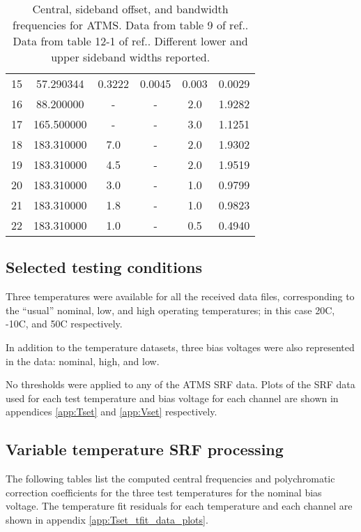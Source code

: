 \begin{table}[htp]
\begin{tabular}{c c c c c c}
           15        &  57.290344  & 0.3222 & 0.0045 & 0.003  & 0.0029        \\
           16        &  88.200000  & -      & -      & 2.0    & 1.9282        \\
           17        & 165.500000  & -      & -      & 3.0    & 1.1251        \\
           18        & 183.310000  & 7.0    & -      & 2.0    & 1.9302        \\
           19        & 183.310000  & 4.5    & -      & 2.0    & 1.9519        \\
           20        & 183.310000  & 3.0    & -      & 1.0    & 0.9799        \\
           21        & 183.310000  & 1.8    & -      & 1.0    & 0.9823        \\
           22        & 183.310000  & 1.0    & -      & 0.5    & 0.4940        \\
    \hline
  \end{tabular}
  \caption{Central, sideband offset, and bandwidth frequencies for ATMS. Data from table 9 of ref.\cite{CrIS_EDR_ATBD}. Data from table 12-1 of ref.\cite{ATMS_PFM_CalLog}. Different lower and upper sideband widths reported. }
  \label{tab:atms_fo_sb_and_df}
\end{table}



\subsection{Selected testing conditions}
Three temperatures were available for all the received data files, corresponding to the ``usual'' nominal, low, and high operating temperatures; in this case 20\textdegree{}C, -10\textdegree{}C, and 50\textdegree{}C respectively.

In addition to the temperature datasets, three bias voltages were also represented in the data: nominal, high, and low.

No thresholds were applied to any of the ATMS SRF data. Plots of the SRF data used for each test temperature and bias voltage for each channel are shown in appendices \ref{app:Tset} and \ref{app:Vset} respectively.


\subsection{Variable temperature SRF processing}
The following tables list the computed central frequencies and polychromatic correction coefficients for the three test temperatures for the nominal bias voltage. The temperature fit residuals for each temperature and each channel are shown in appendix \ref{app:Tset_tfit_data_plots}.

